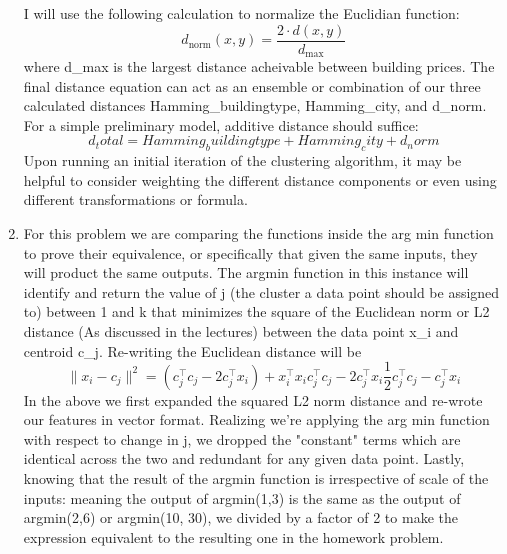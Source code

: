 \documentclass[twoside,10pt]{article}
\begin{document}
\begin{enumerate}
I will use the following calculation to normalize the Euclidian function:
\begin{equation}
d_{\text{norm}}(x, y) = \frac{2 \cdot d(x, y)}{d_{\text{max}}}
\end{equation}
where d_max is the largest distance acheivable between building prices.
The final distance equation can act as an ensemble or combination of our three calculated distances
Hamming_buildingtype, Hamming_city, and d_norm. For a simple preliminary model, additive distance
should suffice:
\begin{equation}
d_total = Hamming_buildingtype + Hamming_city + d_norm
\end{equation}
Upon running an initial iteration of the clustering algorithm, it may be helpful to consider weighting the
different distance components or even using different transformations or formula.

\item For this problem we are comparing the functions inside the arg min function to prove their
equivalence, or specifically that given the same inputs, they will product the same outputs. The argmin
function in this instance will identify and return the value of j (the cluster a data point should be assigned to)
between 1 and k that minimizes the square of the Euclidean norm or L2 distance (As discussed in the lectures)
between the data point x_i and centroid c_j. Re-writing the Euclidean distance will be
\begin{equation}
\|x_i - c_j\|^2 = (c_j^\top c_j - 2c_j^\top x_i) + x_i^\top x_i

c_j^\top c_j - 2c_j^\top x_i

\frac{1}{2} c_j^\top c_j - c_j^\top x_i
\end{equation}
In the above we first expanded the squared L2 norm distance and re-wrote our features in vector format.
Realizing we're applying the arg min function with respect to change in j, we dropped the "constant" terms
which are identical across the two and redundant for any given data point. Lastly, knowing that the result
of the argmin function is irrespective of scale of the inputs: meaning the output of argmin(1,3) is the
same as the output of argmin(2,6) or argmin(10, 30), we divided by a factor of 2 to make the expression
equivalent to the resulting one in the homework problem.


\end{enumerate}
\end{document}
